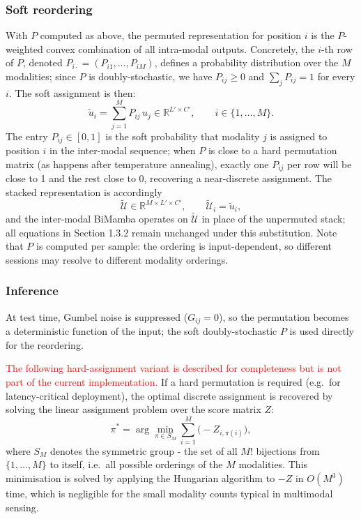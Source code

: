\documentclass[11pt,a4paper]{article}
\newcommand{\R}{\mathbb{R}}
\begin{document}
	\subsubsection*{Soft reordering}
	With $P$ computed as above, the permuted representation for position $i$ is the $P$-weighted convex combination of all intra-modal outputs. Concretely, the $i$-th row of $P$, denoted $P_{i\cdot} = (P_{i1}, \dots, P_{iM})$, defines a probability distribution over the $M$ modalities; since $P$ is doubly-stochastic, we have $P_{ij} \geq 0$ and $\sum_j P_{ij} = 1$ for every $i$. The soft assignment is then:
	$$\tilde{u}_i = \sum_{j=1}^{M} P_{ij}\,u_j \in \R^{L' \times C'}, \qquad i \in \{1,\dots,M\}.$$
	The entry $P_{ij} \in [0,1]$ is the soft probability that modality $j$ is assigned to position $i$ in the inter-modal sequence; when $P$ is close to a hard permutation matrix (as happens after temperature annealing), exactly one $P_{ij}$ per row will be close to 1 and the rest close to 0, recovering a near-discrete assignment. The stacked representation is accordingly $$\tilde{\mathcal{U}} \in \R^{M \times L' \times C'}, \qquad \tilde{\mathcal{U}}_i = \tilde{u}_i,$$ and the inter-modal BiMamba operates on $\tilde{\mathcal{U}}$ in place of the unpermuted stack; all equations in Section 1.3.2 remain unchanged under this substitution. Note that $P$ is computed per sample: the ordering is input-dependent, so different sessions may resolve to different modality orderings.
	
	\subsubsection*{Inference}
	At test time, Gumbel noise is suppressed ($G_{ij} = 0$), so the permutation becomes a deterministic function of the input; the soft doubly-stochastic $P$ is used directly for the reordering.
	
	\textcolor{red}{The following hard-assignment variant is described for completeness but is not part of the current implementation.} If a hard permutation is required (e.g.\ for latency-critical deployment), the optimal discrete assignment is recovered by solving the linear assignment problem over the score matrix $Z$:
	$$\pi^* = \arg\min_{\pi \in S_M} \sum_{i=1}^{M} \bigl(-Z_{i,\pi(i)}\bigr),$$
	where $S_M$ denotes the symmetric group - the set of all $M!$ bijections from $\{1,\dots,M\}$ to itself, i.e.\ all possible orderings of the $M$ modalities. This minimisation is solved by applying the Hungarian algorithm to $-Z$ in $O(M^3)$ time, which is negligible for the small modality counts typical in multimodal sensing.
	
\end{document}
